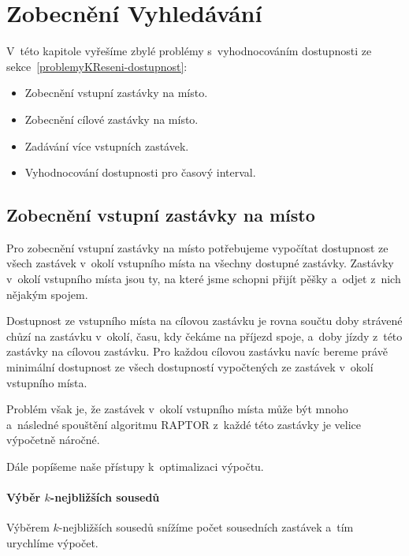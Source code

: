 \chapter{Zobecnění Vyhledávání}\label{kapitola-3}

V~této kapitole vyřešíme zbylé problémy s~vyhodnocováním dostupnosti ze sekce~\ref{problemyKReseni-dostupnost}:
\begin{itemize}
    \item Zobecnění vstupní zastávky na místo.

    \item Zobecnění cílové zastávky na místo.

    \item Zadávání více vstupních zastávek.
    
    \item Vyhodnocování dostupnosti pro časový interval.
\end{itemize}


\section{Zobecnění vstupní zastávky na místo}\label{zobecneni-zadavaniMista}

Pro zobecnění vstupní zastávky na místo potřebujeme vypočítat dostupnost ze všech zastávek v~okolí vstupního místa na všechny dostupné zastávky. Zastávky v~okolí vstupního místa jsou ty, na které jsme schopni přijít pěšky a~odjet z~nich nějakým spojem.

Dostupnost ze vstupního místa na cílovou zastávku je rovna součtu doby strávené chůzí na zastávku v~okolí, času, kdy čekáme na příjezd spoje, a~doby jízdy z~této zastávky na cílovou zastávku. Pro každou cílovou zastávku navíc bereme právě minimální dostupnost ze všech dostupností vypočtených ze zastávek v~okolí vstupního místa.

Problém však je, že zastávek v~okolí vstupního místa může být mnoho a~následné spouštění algoritmu RAPTOR z~každé této zastávky je velice výpočetně náročné.

Dále popíšeme naše přístupy k~optimalizaci výpočtu.

\subsubsection{Výběr $k$-nejbližších sousedů}

Výběrem $k$-nejbližších sousedů snížíme počet sousedních zastávek a~tím urychlíme výpočet.

